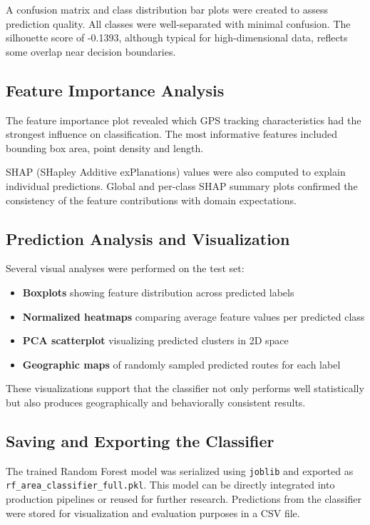 \documentclass[a4paper,12pt,twoside]{scrreprt}
\begin{document}
A confusion matrix and class distribution bar plots were created to assess
prediction quality. All classes were well-separated with minimal confusion. The
silhouette score of -0.1393, although typical for high-dimensional data,
reflects some overlap near decision boundaries.

\subsection{Feature Importance Analysis}

The feature importance plot revealed which GPS tracking characteristics had the
strongest influence on classification. The most informative features included
bounding box area, point density and length.

SHAP (SHapley Additive exPlanations) values were also computed to explain
individual predictions. Global and per-class SHAP summary plots confirmed the
consistency of the feature contributions with domain expectations.

\subsection{Prediction Analysis and Visualization}

Several visual analyses were performed on the test set:

\begin{itemize}
  \item \textbf{Boxplots} showing feature distribution across predicted labels
  \item \textbf{Normalized heatmaps} comparing average feature values per
        predicted class
  \item \textbf{PCA scatterplot} visualizing predicted clusters in 2D space
  \item \textbf{Geographic maps} of randomly sampled predicted routes for each
        label
\end{itemize}

These visualizations support that the classifier not only performs well
statistically but also produces geographically and behaviorally consistent
results.

\subsection{Saving and Exporting the Classifier}

The trained Random Forest model was serialized using \texttt{joblib} and
exported as \texttt{rf\_area\_classifier\_full.pkl}. This model can be directly
integrated into production pipelines or reused for further research.
Predictions from the classifier were stored for visualization and evaluation
purposes in a CSV file.
\end{document}
